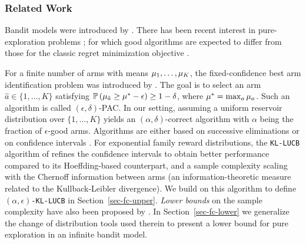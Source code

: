 \subsubsection{Related Work}\label{sec-related}

Bandit models were introduced by
\cite{10.2307/2332286}.
There has been recent interest in
pure-exploration problems
\citep{EvenDaral06,Bubeck10BestArm}; for which good algorithms
are expected to differ from those for the classic
regret minimization objective
\citep{Bubeckal11,ESAIM17}.

For a finite number of arms with means $\mu_1,\dots,\mu_K$, the fixed-confidence
best arm identification problem was introduced by \cite{EvenDaral06}. The goal
is to
select an arm $\hat{a} \in \{1,\dots,K\}$ satisfying
$\mathbb{P}\left(  \mu_{\hat{a}} \geq \mu^* - \epsilon  \right) \geq 1-\delta$, where
$\mu^* = \max_a \mu_a$. Such an algorithm is called $(\epsilon,\delta)$-PAC.
In our setting, assuming a uniform reservoir distribution over
$\{1,\dots,K\}$ yields an $(\alpha,\delta)$-correct algorithm with $\alpha$
being the fraction of $\epsilon$-good arms. 
Algorithms are either
based on successive eliminations \citep{EvenDaral06,icml2013_karnin13} or on 
confidence intervals
\citep{DBLP:conf/icml/KalyanakrishnanTAS12,NIPS2012_4640}. For exponential family reward
distributions, the \texttt{KL-LUCB}
algorithm of \cite{COLT13} refines the confidence
intervals to obtain better performance compared to its Hoeffding-based
counterpart, and a sample complexity scaling with the Chernoff information
between arms
(an information-theoretic measure related to the Kullback-Leibler
divergence). We build on this algorithm to define \texttt{$(\alpha,\epsilon)$-KL-LUCB} in
Section~\ref{sec-fc-upper}. \emph{Lower bounds} on the sample complexity have
also
been proposed by \cite{Mannor04thesample,JMLR15,GK16}.
 In Section~\ref{sec-fc-lower} we generalize the change of
distribution tools used therein to present a lower bound for pure exploration
in an infinite bandit model.

